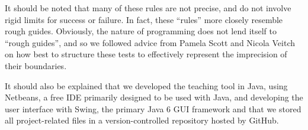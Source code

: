 It should be noted that many of these rules are not precise, and do
not involve rigid limits for success or failure.
In fact, these ``rules'' more closely resemble rough guides.
Obviously, the nature of programming does not lend itself to ``rough
guides'', and so we followed advice from Pamela Scott and Nicola
Veitch on how best to structure these tests to effectively represent
the imprecision of their boundaries.

It should also be explained that we developed the teaching tool
in Java, using Netbeans, a free IDE primarily designed to be used with
Java, and developing the user interface with Swing, the primary Java 6
GUI framework and that we stored all project-related files in a
version-controlled repository hosted by GitHub.
